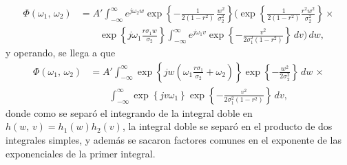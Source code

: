 \documentclass[a4paper]{report}
\begin{document}
\begin{align*}
 \Phi(\omega_1,\,\omega_2)&=A'\int_{-\infty}^{\infty}e^{j\omega_2w}\exp\left\{-\frac{1}{2(1-r^2)}\,\frac{w^2}{\sigma_2^2}\right\}
 \bigg(\exp\left\{\frac{1}{2(1-r^2)}\frac{r^2w^2}{\sigma_2^2}\right\}\times\\
 &\qquad\exp\left\{j\omega_1\frac{r\sigma_1w}{\sigma_2}\right\}\int_{-\infty}^{\infty}e^{j\omega_1v}
 \exp\left\{-\frac{v^2}{2\sigma_1^2(1-r^2)}\right\}\,dv\bigg)\,dw,
\end{align*}
y operando, se llega a que
\begin{equation}\label{eq:normal_joint_characteristic_function_deduction_tmp2}
 \begin{aligned}
 \Phi(\omega_1,\,\omega_2)&=A'\int_{-\infty}^{\infty}\exp\left\{jw\left(\omega_1\frac{r\sigma_1}{\sigma_2}+\omega_2\right)\right\}\exp\left\{-\frac{w^2}{2\sigma_2^2}\right\}
 \,dw\,\times\\
 &\qquad\int_{-\infty}^{\infty}\exp\left\{jv\omega_1\right\}
 \exp\left\{-\frac{v^2}{2\sigma_1^2(1-r^2)}\right\}\,dv,
\end{aligned}
\end{equation}
donde como se separó el integrando de la integral doble en \(h(w,\,v)=h_1(w)h_2(v)\), la integral doble se separó en el producto de dos integrales simples, y además se sacaron factores comunes en el exponente de las exponenciales de la primer integral.
\end{document}
